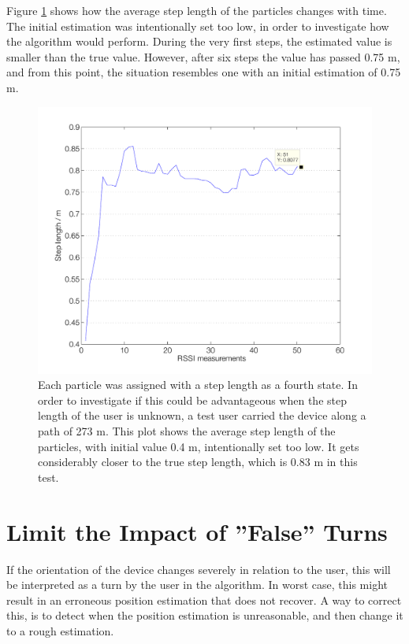 \documentclass{LTHthesis}
\begin{document}
Figure \ref{step_length} shows how the average step length of the particles changes with time. The initial estimation was intentionally set too low, in order to investigate how the algorithm would perform. During the very first steps, the estimated value is smaller than the true value. However, after six steps the value has passed 0.75 m, and from this point, the situation resembles one with an initial estimation of 0.75 m. 
%
\begin{figure}[!hbt]

\includegraphics[width=1\textwidth ]{images/sensor_fused/step_length}
\caption{Each particle was assigned with a step length as a fourth state. In order to investigate if this could be advantageous when the step length of the user is unknown, a test user carried the device along a path of 273 m. This plot shows the average step length of the particles, with initial value 0.4 m, intentionally set too low. It gets considerably closer to the true step length, which is 0.83 m in this test.}\label{step_length}
\end{figure}
%
\section{Limit the Impact of ''False'' Turns}
%
If the orientation of the device changes severely in relation to the user, this will be interpreted as a turn by the user in the algorithm. In worst case, this might result in an erroneous position estimation that does not recover. A way to correct this, is to detect when the position estimation is unreasonable, and then change it to a rough estimation.
\end{document}
